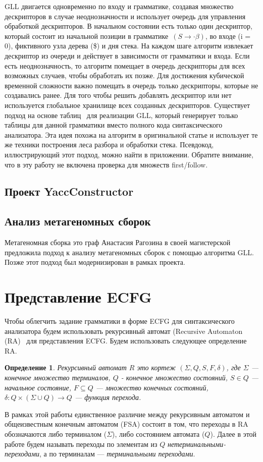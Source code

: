 \documentclass[12pt]{matmex-diploma-custom}
\newtheorem{mydef}{Определение}
\begin{document}
	GLL двигается одновременно по входу и грамматике, создавая множество дескрипторов
	в случае неоднозначности и использует очередь для управления обработкой дескрипторов.
	В начальном состоянии есть только один дескриптор, который состоит из начальной 
	позиции в грамматике~$(S \to \cdot \beta)$, во входе (i = 0), фиктивного узла дерева (\$)
	и дня стека. На каждом шаге алгоритм извлекает дескриптор из очереди и действует
	в зависимости от грамматики и входа. Если есть неоднозначность, то алгоритм помещает
	в очередь дескрипторы для всех возможных случаев, чтобы обработать их позже. 
	Для достижения кубической временной сложности важно помещать в очередь только дескрипторы,
	которые не создавались ранее. Для того чтобы решить добавлять дескриптор или нет
	используется глобальное хранилище всех созданных дескрипторов.
	Существует подход на основе таблиц~\cite{ragozina} для реализации GLL, который генерирует
	только таблицы для данной грамматики вместо полного кода синтаксического анализатора.
	Эта идея похожа на алгоритм в оригинальной статье и использует те же техники
	построения леса разбора и обработки стека. Псевдокод, иллюстрирующий этот подход, 
	можно найти в приложении. Обратите внимание, что в эту работу не включена
	проверка для множеств first/follow.
	
	\subsection{Проект YaccConstructor}
	
	\subsection{Анализ метагеномных сборок}
	
	
	Метагеномная сборка это граф
	Анастасия Рагозина в своей магистерской предложила подход к анализу метагеномных
	сборок с помощью алгоритма GLL. Позже этот подход был модернизирован в рамках проекта.
	
	
	\section{Представление ECFG}
	
	Чтобы облегчить задание грамматики в форме ECFG для синтаксического анализатора
	будем использовать рекурсивный автомат (Recursive Automaton (RA)~\cite{tellier2006learning}
	для представления ECFG. Будем использовать следующее определение RA.
	\begin{mydef}
		Рекурсивный автомат $R$ это кортеж $(\Sigma, Q, S, F, \delta)$, где $\Sigma$
		--- конечное множество терминалов, $Q$ - конечное множество состояний, $S \in Q$ 
		--- начальное состояние, $F \subseteq Q$ --- множество конечных состояний,
		$\delta : Q \times (\Sigma \cup Q) \to Q$ --- функция перехода.
	\end{mydef}
	В рамках этой работы единственное различие между рекурсивным автоматом и общеизвестным
	конечным автоматом (FSA) состоит в том, что переходы в RA обозначаются либо терминалом ($\Sigma$),
	либо состоянием автомата ($Q$). Далее в этой работе будем называть переходы по элементам из
	$Q$ \textit{нетерминальными-переходами}, а по терминалам --- \textit{терминальными переходами}.
	
\end{document}
